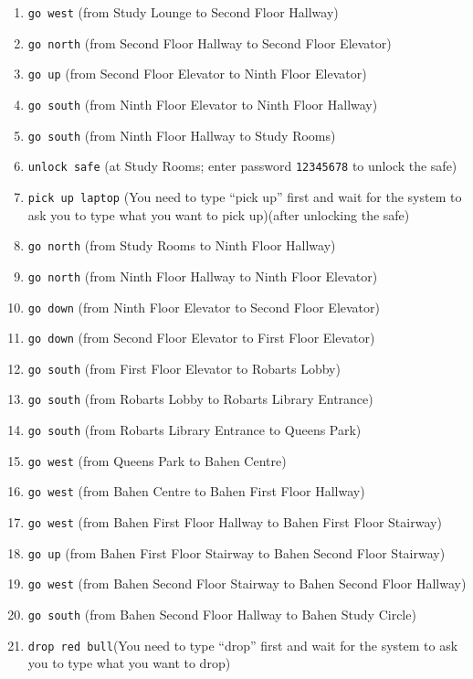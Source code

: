 \documentclass[11pt]{article}
\begin{document}
\begin{enumerate}
    \item \texttt{go west} \quad (from Study Lounge to Second Floor Hallway)
    \item \texttt{go north} \quad (from Second Floor Hallway to Second Floor Elevator)
    \item \texttt{go up} \quad (from Second Floor Elevator to Ninth Floor Elevator)
    \item \texttt{go south} \quad (from Ninth Floor Elevator to Ninth Floor Hallway)
    \item \texttt{go south} \quad (from Ninth Floor Hallway to Study Rooms)
    \item \texttt{unlock safe} \quad (at Study Rooms; enter password \texttt{12345678} to unlock the safe)
    \item \texttt{pick up laptop} \quad (You need to type “pick up” first and wait for the system to ask you to type what you want to pick up)\quad (after unlocking the safe)
    \item \texttt{go north} \quad (from Study Rooms to Ninth Floor Hallway)
    \item \texttt{go north} \quad (from Ninth Floor Hallway to Ninth Floor Elevator)
    \item \texttt{go down} \quad (from Ninth Floor Elevator to Second Floor Elevator)
    \item \texttt{go down} \quad (from Second Floor Elevator to First Floor Elevator)
    \item \texttt{go south} \quad (from First Floor Elevator to Robarts Lobby)
    \item \texttt{go south} \quad (from Robarts Lobby to Robarts Library Entrance)
    \item \texttt{go south} \quad (from Robarts Library Entrance to Queens Park)
    \item \texttt{go west} \quad (from Queens Park to Bahen Centre)
    \item \texttt{go west} \quad (from Bahen Centre to Bahen First Floor Hallway)
    \item \texttt{go west} \quad (from Bahen First Floor Hallway to Bahen First Floor Stairway)
    \item \texttt{go up} \quad (from Bahen First Floor Stairway to Bahen Second Floor Stairway)
    \item \texttt{go west} \quad (from Bahen Second Floor Stairway to Bahen Second Floor Hallway)
    \item \texttt{go south} \quad (from Bahen Second Floor Hallway to Bahen Study Circle)
    \item \texttt{drop red bull}\quad (You need to type “drop” first and wait for the system to ask you to type what you want to drop)

\end{enumerate}
\end{document}
